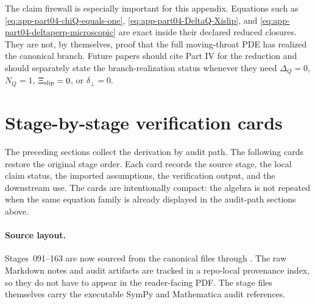 The claim firewall is especially important for this appendix.  Equations such as \eqref{eq:app-part04-chiQ-equals-one}, \eqref{eq:app-part04-DeltaQ-Xislip}, and \eqref{eq:app-part04-deltaperp-microscopic} are exact inside their declared reduced closures.  They are not, by themselves, proof that the full moving-throat PDE has realized the canonical branch.  Future papers should cite Part IV for the reduction and should separately state the branch-realization status whenever they need \(\Delta_Q=0\), \(N_Q=1\), \(\Xi_{\rm slip}=0\), or \(\delta_\perp=0\).



\begingroup
\let\clearpage\relax
\clearpage
\section{Stage-by-stage verification cards}
\label{sec:app-part04-stage-cards}

The preceding sections collect the derivation by audit path.  The following cards restore the original stage order.  Each card records the source stage, the local claim status, the imported assumptions, the verification output, and the downstream use.  The cards are intentionally compact: the algebra is not repeated when the same equation family is already displayed in the audit-path sections above.


\paragraph{Source layout.}
Stages~091--163 are now sourced from the canonical files  through .  The raw Markdown notes and audit artifacts are tracked in a repo-local provenance index, so they do not have to appear in the reader-facing PDF.  The stage files themselves carry the executable SymPy and Mathematica audit references.

